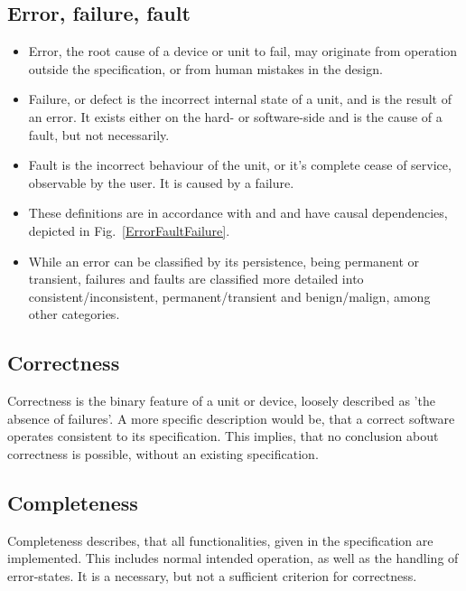 	\subsection{Error, failure, fault}
	\begin{minipage}{\linewidth}
	\begin{itemize}
		\item {Error}, the root cause of a device or unit to fail, may originate from operation outside the specification, or from human mistakes in the design.
		\item {Failure}, or defect is the incorrect internal state of a unit, and is the result of an error. It exists either on the hard- or software-side and is the cause of a fault, but not necessarily.
		\item {Fault} is the incorrect behaviour of the unit, or it's complete cease of service, observable by the user. It is caused by a failure.
		\item These definitions are in accordance with \cite{Liggesmeyer2002} and \cite{Kopetz1997} and have causal dependencies, depicted in Fig.~\ref{ErrorFaultFailure}.
		\item While an error can be classified by its persistence, being permanent or transient, failures and faults are classified more detailed into consistent/inconsistent, permanent/transient and benign/malign, among other categories.
	\end{itemize}
	\end{minipage}
	
	\subsection{Correctness}
		{Correctness} is the binary feature of a unit or device, loosely described as 'the absence of failures'. A more specific description would be, that a correct software operates consistent to its specification. This implies, that no conclusion about correctness is possible, without an existing specification.
	\subsection{Completeness}
		{Completeness} describes, that all functionalities, given in the specification are implemented. This includes normal intended operation, as well as the handling of error-states. It is a necessary, but not a sufficient criterion for correctness.
